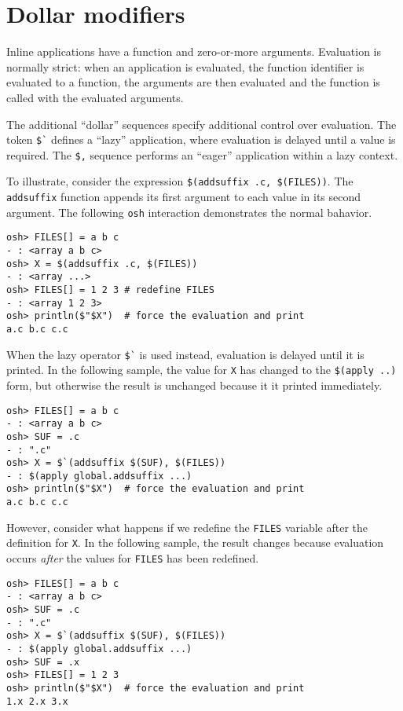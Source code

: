 %
\section{Dollar modifiers}
\label{section:dollar}

Inline applications have a function and zero-or-more arguments.  Evaluation is normally strict: when
an application is evaluated, the function identifier is evaluated to a function, the arguments are
then evaluated and the function is called with the evaluated arguments.

The additional ``dollar'' sequences specify additional control over evaluation.  The token \verb+$`+
defines a ``lazy'' application, where evaluation is delayed until a value is required.  The
\verb+$,+ sequence performs an ``eager'' application within a lazy context.

To illustrate, consider the expression \verb+$(addsuffix .c, $(FILES))+.  The \verb+addsuffix+
function appends its first argument to each value in its second argument.  The following \verb+osh+
interaction demonstrates the normal bahavior.

\begin{verbatim}
osh> FILES[] = a b c
- : <array a b c>
osh> X = $(addsuffix .c, $(FILES))
- : <array ...>
osh> FILES[] = 1 2 3 # redefine FILES
- : <array 1 2 3>
osh> println($"$X")  # force the evaluation and print
a.c b.c c.c
\end{verbatim}

When the lazy operator \verb+$`+ is used instead, evaluation is delayed until it is printed.  In the
following sample, the value for \verb+X+ has changed to the \verb+$(apply ..)+ form, but otherwise
the result is unchanged because it it printed immediately.

\begin{verbatim}
osh> FILES[] = a b c
- : <array a b c>
osh> SUF = .c
- : ".c"
osh> X = $`(addsuffix $(SUF), $(FILES))
- : $(apply global.addsuffix ...)
osh> println($"$X")  # force the evaluation and print
a.c b.c c.c
\end{verbatim}

However, consider what happens if we redefine the \verb+FILES+ variable after the definition for
\verb+X+.  In the following sample, the result changes because evaluation occurs \emph{after} the
values for \verb+FILES+ has been redefined.

\begin{verbatim}
osh> FILES[] = a b c
- : <array a b c>
osh> SUF = .c
- : ".c"
osh> X = $`(addsuffix $(SUF), $(FILES))
- : $(apply global.addsuffix ...)
osh> SUF = .x
osh> FILES[] = 1 2 3
osh> println($"$X")  # force the evaluation and print
1.x 2.x 3.x
\end{verbatim}

